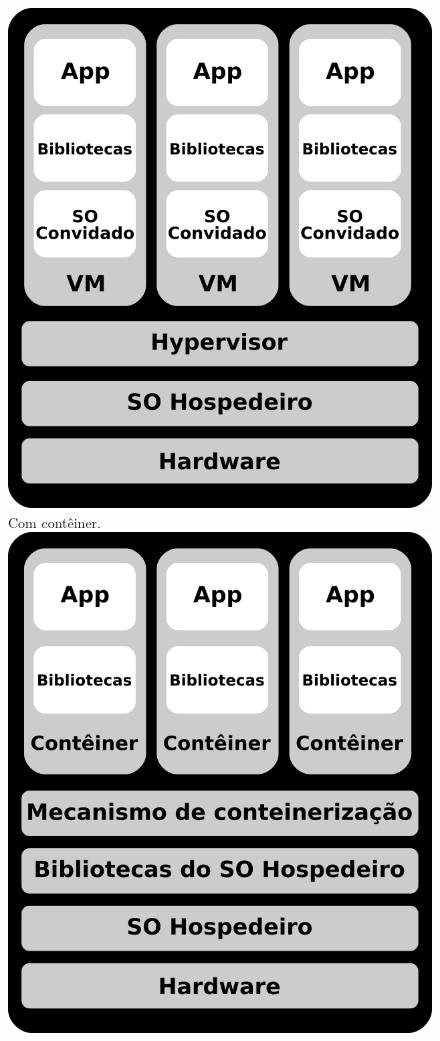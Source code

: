 \begin{figure}[tb]
                   {\includegraphics[width=\textwidth]{content/images/vmvscont-2.png}}
    \qquad
                   {Com contêiner.}
                   {\includegraphics[width=\textwidth]{content/images/vmvscont-3.png}}

    \label{fig.cont}
\end{figure}

